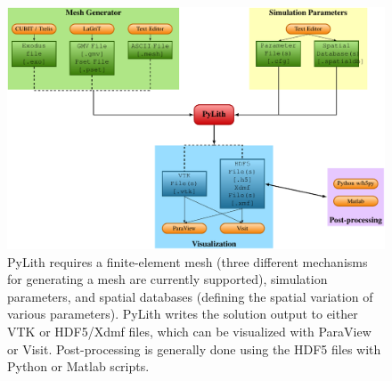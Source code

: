 \begin{figure}[htbp]
  \includegraphics[width=5in]{runpylith/figs/runpylith} 
  \caption{PyLith requires a finite-element mesh (three different
    mechanisms for generating a mesh are currently supported),
    simulation parameters, and spatial databases (defining the spatial
    variation of various parameters).  PyLith writes the solution
    output to either VTK or HDF5/Xdmf files, which can be visualized
    with ParaView or Visit. Post-processing is generally done using
    the HDF5 files with Python or Matlab scripts.}
\label{fig:pylith:workflow} 
\end{figure}












